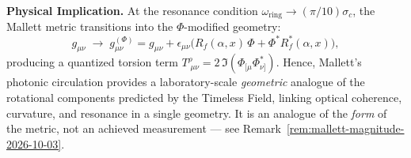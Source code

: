 \vspace{1em}
\noindent\textbf{Physical Implication.}
At the resonance condition $\omega_{\mathrm{ring}}\!\rightarrow\!(\pi/10)\sigma_c$,
the Mallett metric transitions into the $\Phi$-modified geometry:
\[
g_{\mu\nu} \;\longrightarrow\; g_{\mu\nu}^{(\Phi)}
    = g_{\mu\nu} + \epsilon_{\mu\nu}
      \bigl(R_f(\alpha,x)\,\Phi + \Phi^{\!*}R_f^{\!*}(\alpha,x)\bigr),
\]
producing a quantized torsion term
$T^{\rho}_{\;\mu\nu} = 2\,\Im(\Phi_{[\mu}\Phi^{\!*}_{\nu]})$.
Hence, Mallett's photonic circulation provides a laboratory-scale \emph{geometric}
analogue of the rotational components predicted by the Timeless Field, linking
optical coherence, curvature, and resonance in a single geometry. It is an
analogue of the \emph{form} of the metric, not an achieved measurement --- see
Remark~\ref{rem:mallett-magnitude-2026-10-03}.

